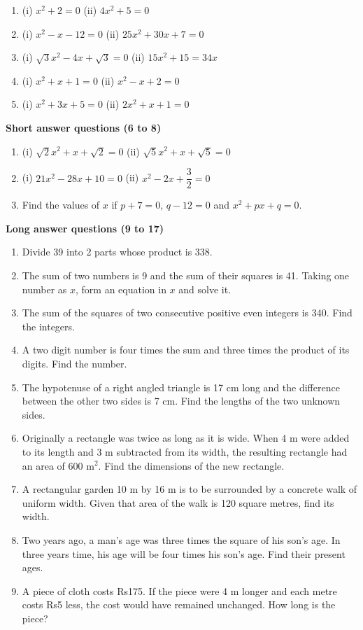 \documentclass[12pt,a4paper]{article}
\begin{document}
\begin{enumerate}
    \item (i) \( x^2 + 2 = 0 \) \quad (ii) \( 4x^2 + 5 = 0 \)
    \item (i) \( x^2 - x - 12 = 0 \) \quad (ii) \( 25x^2 + 30x + 7 = 0 \)
    \item (i) \( \sqrt{3}x^2 - 4x + \sqrt{3} = 0 \) \quad (ii) \( 15x^2 + 15 = 34x \)
    \item (i) \( x^2 + x + 1 = 0 \) \quad (ii) \( x^2 - x + 2 = 0 \)
    \item (i) \( x^2 + 3x + 5 = 0 \) \quad (ii) \( 2x^2 + x + 1 = 0 \)
\end{enumerate}

\textbf{Short answer questions (6 to 8)}

\begin{enumerate}[start=6]
    \item (i) \( \sqrt{2}x^2 + x + \sqrt{2} = 0 \) \quad (ii) \( \sqrt{5}x^2 + x + \sqrt{5} = 0 \)
    \item (i) \( 21x^2 - 28x + 10 = 0 \) \quad (ii) \( x^2 - 2x + \dfrac{3}{2} = 0 \)
    \item Find the values of \( x \) if \( p + 7 = 0 \), \( q - 12 = 0 \) and \( x^2 + px + q = 0 \).
\end{enumerate}

\textbf{Long answer questions (9 to 17)}

\begin{enumerate}[start=9]
    \item Divide 39 into 2 parts whose product is 338.
    \item The sum of two numbers is 9 and the sum of their squares is 41. Taking one number as \( x \), form an equation in \( x \) and solve it.
    \item The sum of the squares of two consecutive positive even integers is 340. Find the integers.
    \item A two digit number is four times the sum and three times the product of its digits. Find the number.
    \item The hypotenuse of a right angled triangle is 17 cm long and the difference between the other two sides is 7 cm. Find the lengths of the two unknown sides.
    \item Originally a rectangle was twice as long as it is wide. When 4 m were added to its length and 3 m subtracted from its width, the resulting rectangle had an area of 600 m\(^2\). Find the dimensions of the new rectangle.
    \item A rectangular garden 10 m by 16 m is to be surrounded by a concrete walk of uniform width. Given that area of the walk is 120 square metres, find its width.
    \item Two years ago, a man's age was three times the square of his son's age. In three years time, his age will be four times his son's age. Find their present ages.
    \item A piece of cloth costs Rs175. If the piece were 4 m longer and each metre costs Rs5 less, the cost would have remained unchanged. How long is the piece?
\end{enumerate}
\end{document}
